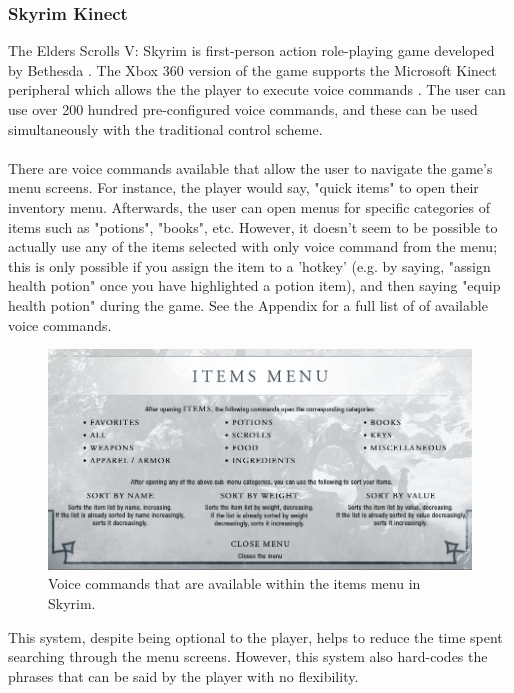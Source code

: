 \documentclass[12pt]{article}
\begin{document}
\subsubsection{Skyrim Kinect}
The Elders Scrolls V: Skyrim is first-person action role-playing game developed by Bethesda \cite{RefWorks:23}. The Xbox 360 version of the game supports the Microsoft Kinect peripheral which allows the the player to execute voice commands \cite{RefWorks:24}. The user can use over 200 hundred pre-configured voice commands, and these can be used simultaneously with the traditional control scheme.
\\
\\
There are voice commands available that allow the user to navigate the game's menu screens. For instance, the player would say, "quick items" to open their inventory menu. Afterwards, the user can open menus for specific categories of items such as "potions", "books", etc. However, it doesn't seem to be possible to actually use any of the items selected with only voice command from the menu; this is only possible if you assign the item to a 'hotkey' (e.g. by saying, "assign health potion" once you have highlighted a potion item), and then saying "equip health potion" during the game. See the Appendix for a full list of of available voice commands.
\begin{center}
\begin{figure}[H]
  \includegraphics[width=\textwidth]{skyrim-item-commands.png}
  \caption{Voice commands that are available within the items menu in Skyrim.}
\end{figure}
\end{center}
This system, despite being optional to the player, helps to reduce the time spent searching through the menu screens. However, this system also hard-codes the phrases that can be said by the player with no flexibility.
\end{document}
